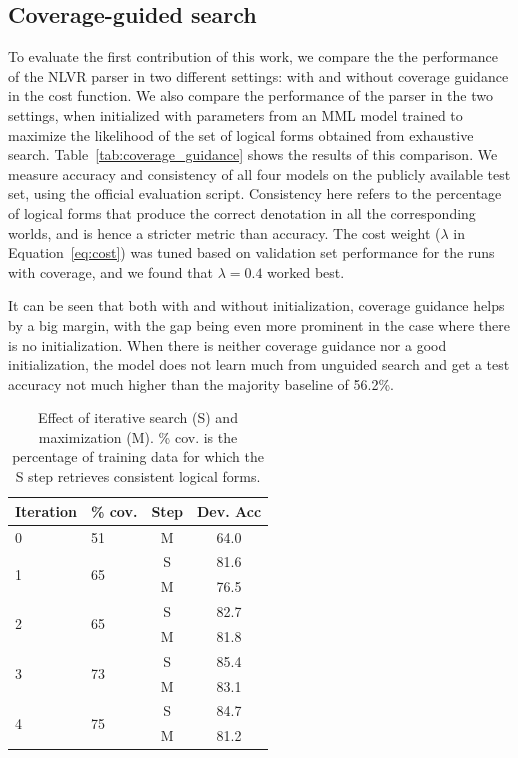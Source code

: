 \subsection{Coverage-guided search} \label{sec:results_coverage}
To evaluate the first contribution of this work, we compare the the performance of the NLVR parser in two different settings: with and without coverage guidance in the cost function. We also compare the performance of the parser in the two settings, when initialized with parameters from an MML model trained to maximize the likelihood of the set of logical forms obtained from exhaustive search. Table~\ref{tab:coverage_guidance} shows the results of this comparison. We measure accuracy and consistency of all four models on the publicly available test set, using the official evaluation script. Consistency here refers to the percentage of logical forms that produce the correct denotation in all the corresponding worlds, and is hence a stricter metric than accuracy. The cost weight ($\lambda$ in Equation~\ref{eq:cost}) was tuned based on validation set performance for the runs with coverage, and we found that $\lambda = 0.4$ worked best.

It can be seen that both with and without initialization, coverage guidance helps by a big margin, with the gap being even more prominent in the case where there is no initialization. When there is neither coverage guidance nor a good initialization, the model does not learn much from unguided search and get a test accuracy not much higher than the majority baseline of 56.2\%.

\begin{table}
	\centering
	\begin{tabular}{llcc}
	\toprule
	Iteration & \% cov. & Step & Dev. Acc  \\
	\midrule
	0 & 51 & M & 64.0 \\
	\hline
	\multirow{2}{*}{1} & \multirow{2}{*}{65} & S & 81.6  \\
	& &  M & 76.5  \\
	\hline
	\multirow{2}{*}{2} & \multirow{2}{*}{65} & S & 82.7  \\
	& &  M & 81.8  \\
	\hline
	\multirow{2}{*}{3} & \multirow{2}{*}{73} & S & 85.4  \\
	& &  M & 83.1  \\
	\hline
	\multirow{2}{*}{4} & \multirow{2}{*}{75} & S & 84.7  \\
	& &  M & 81.2  \\
	\bottomrule
	\end{tabular}
	\caption{Effect of iterative search (S) and maximization (M). \% cov. is the percentage of training data for which the S step retrieves consistent logical forms.}\label{tab:iterative_search_nlvr}
\end{table}

